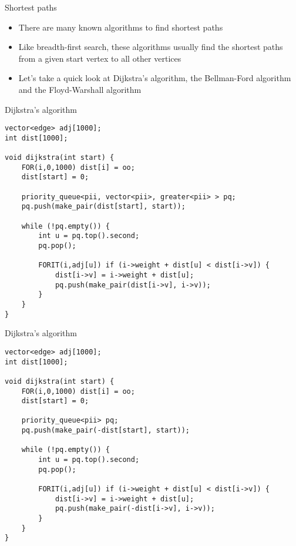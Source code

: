 \documentclass[12pt,t]{beamer}
\newcommand{\bi}{\begin{itemize}}
\newcommand{\ei}{\end{itemize}}
\begin{document}
\begin{frame}{Shortest paths}
    \vspace{40pt}
    \bi
        \item There are many known algorithms to find shortest paths
        \item Like breadth-first search, these algorithms usually find the shortest paths from a given start vertex to all other vertices
        \vspace{5pt}
        \item Let's take a quick look at Dijkstra's algorithm, the Bellman-Ford algorithm and the Floyd-Warshall algorithm
    \ei
\end{frame}


\begin{frame}[fragile]{Dijkstra's algorithm}
    \begin{verbatim}
vector<edge> adj[1000];
int dist[1000];

void dijkstra(int start) {
    FOR(i,0,1000) dist[i] = oo;
    dist[start] = 0;
    
    priority_queue<pii, vector<pii>, greater<pii> > pq;
    pq.push(make_pair(dist[start], start));

    while (!pq.empty()) {
        int u = pq.top().second;
        pq.pop();

        FORIT(i,adj[u]) if (i->weight + dist[u] < dist[i->v]) {
            dist[i->v] = i->weight + dist[u];
            pq.push(make_pair(dist[i->v], i->v));
        }
    }
}
    \end{verbatim}
\end{frame}

\begin{frame}[fragile]{Dijkstra's algorithm}
    \begin{verbatim}
vector<edge> adj[1000];
int dist[1000];

void dijkstra(int start) {
    FOR(i,0,1000) dist[i] = oo;
    dist[start] = 0;
    
    priority_queue<pii> pq;
    pq.push(make_pair(-dist[start], start));

    while (!pq.empty()) {
        int u = pq.top().second;
        pq.pop();

        FORIT(i,adj[u]) if (i->weight + dist[u] < dist[i->v]) {
            dist[i->v] = i->weight + dist[u];
            pq.push(make_pair(-dist[i->v], i->v));
        }
    }
}
    \end{verbatim}
\end{frame}
\end{document}
